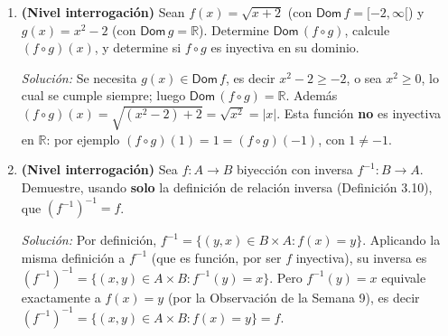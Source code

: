 \documentclass[11pt]{article}
\begin{document}
\begin{enumerate}[label=\arabic*.]
\textit{Solución:} $f\circ g(x) = 3\left(\dfrac{x+2}{3}\right)-2 = (x+2)-2 = x$, y
$g\circ f(x) = \dfrac{(3x-2)+2}{3} = x$. Como ambas composiciones dan la identidad, $g=f^{-1}$.
Luego, en $f(g(f(x)))$, la parte interior $g(f(x)) = g\circ f(x) = x$ (por lo recién demostrado),
así que $f(g(f(x))) = f(x)$. La ecuación se reduce entonces a $f(x)=10$, es decir $3x-2=10$, de
donde $x=4$.

\item \textbf{(Nivel interrogación)} Sean $f(x) = \sqrt{x+2}$ (con $\mathsf{Dom}\,f=[-2,\infty[$)
y $g(x) = x^2-2$ (con $\mathsf{Dom}\,g=\mathbb{R}$). Determine $\mathsf{Dom}\,(f\circ g)$, calcule
$(f\circ g)(x)$, y determine si $f\circ g$ es inyectiva en su dominio.

\textit{Solución:} Se necesita $g(x)\in\mathsf{Dom}\,f$, es decir $x^2-2\ge-2$, o sea $x^2\ge0$,
lo cual se cumple siempre; luego $\mathsf{Dom}\,(f\circ g)=\mathbb{R}$. Además
$(f\circ g)(x) = \sqrt{(x^2-2)+2} = \sqrt{x^2} = |x|$. Esta función \textbf{no} es inyectiva en
$\mathbb{R}$: por ejemplo $(f\circ g)(1) = 1 = (f\circ g)(-1)$, con $1\neq-1$.

\item \textbf{(Nivel interrogación)} Sea $f:A\to B$ biyección con inversa $f^{-1}:B\to A$.
Demuestre, usando \textbf{solo} la definición de relación inversa (Definición 3.10), que
$(f^{-1})^{-1} = f$.

\textit{Solución:} Por definición, $f^{-1} = \{(y,x)\in B\times A : f(x)=y\}$. Aplicando la misma
definición a $f^{-1}$ (que es función, por ser $f$ inyectiva), su inversa es
$(f^{-1})^{-1} = \{(x,y)\in A\times B : f^{-1}(y)=x\}$. Pero $f^{-1}(y)=x$ equivale exactamente a
$f(x)=y$ (por la Observación de la Semana 9), es decir
$(f^{-1})^{-1} = \{(x,y)\in A\times B : f(x)=y\} = f$.
\end{enumerate}
\end{document}
